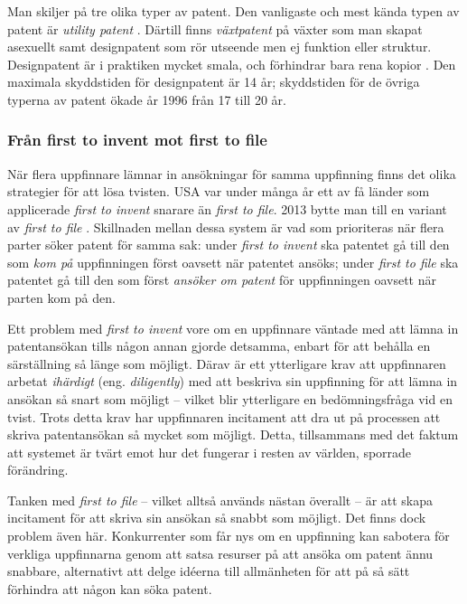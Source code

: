Man skiljer på tre olika typer av patent. Den vanligaste och mest kända typen av patent är \emph{utility patent} \cite{cmu-overview}.
Därtill finns \emph{växtpatent} på växter som man skapat asexuellt samt designpatent som rör utseende men ej funktion eller struktur. Designpatent är i praktiken mycket smala, och förhindrar bara rena kopior . Den maximala skyddstiden för designpatent är 14 år; skyddstiden för de övriga typerna av patent ökade år 1996 från 17 till 20 år.


\subsubsection{Från first to invent mot first to file} 

När flera uppfinnare lämnar in ansökningar för samma uppfinning finns det olika strategier för att lösa tvisten. USA var under många år ett av få länder som applicerade \emph{first to invent} snarare än \emph{first to file}. 2013 bytte man till en variant av \emph{first to file} \cite{kravets}. Skillnaden mellan dessa system är vad som prioriteras när flera parter söker patent för samma sak: under \emph{first to invent} ska patentet gå till den som \emph{kom på} uppfinningen först oavsett när patentet ansöks; under \emph{first to file} ska patentet gå till den som först \emph{ansöker om patent} för uppfinningen oavsett när parten kom på den.

Ett problem med \emph{first to invent} vore om en uppfinnare väntade med att lämna in patentansökan tills någon annan gjorde detsamma, enbart för att behålla en särställning så länge som möjligt. Därav är ett ytterligare krav att uppfinnaren arbetat \emph{ihärdigt} (eng. \emph{diligently}) med att beskriva sin uppfinning för att lämna in ansökan så snart som möjligt -- vilket blir ytterligare en bedömningsfråga vid en tvist. Trots detta krav har uppfinnaren incitament att dra ut på processen att skriva patentansökan så mycket som möjligt. Detta, tillsammans med det faktum att systemet är tvärt emot hur det fungerar i resten av världen, sporrade förändring.

Tanken med \emph{first to file} -- vilket alltså används nästan överallt -- är att skapa incitament för att skriva sin ansökan så snabbt som möjligt. Det finns dock problem även här. Konkurrenter som får nys om en uppfinning kan sabotera för verkliga uppfinnarna genom att satsa resurser på att ansöka om patent ännu snabbare, alternativt att delge idéerna till allmänheten för att på så sätt förhindra att någon kan söka patent.

